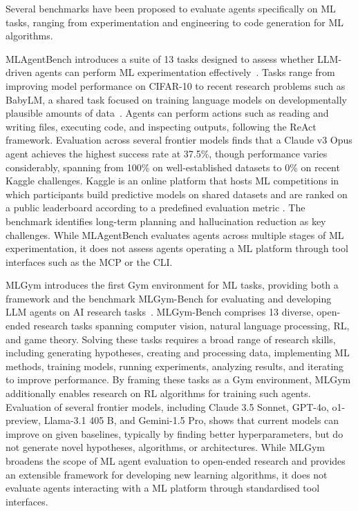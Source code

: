 \documentclass[
english,                 %
bibtex,                  %
includeExtraAbstracts, %
]{kththesis}
\numberwithin{listing}{chapter}
\begin{document}
Several benchmarks have been proposed to evaluate agents specifically on \gls{ML} tasks, ranging from experimentation and engineering to code generation for \gls{ML} algorithms.

\gls{ML}AgentBench introduces a suite of 13 tasks designed to assess whether \gls{LLM}-driven agents can perform \gls{ML} experimentation effectively~\cite{huang_mlagentbench_2024}. Tasks range from improving model performance on \gls{CIFAR}-10 to recent research problems such as \gls{BabyLM}, a shared task focused on training language models on developmentally plausible amounts of data~\cite{edman_mask_2025}. Agents can perform actions such as reading and writing files, executing code, and inspecting outputs, following the ReAct framework. Evaluation across several frontier models finds that a Claude v3 Opus agent achieves the highest success rate at 37.5\%, though performance varies considerably, spanning from 100\% on well-established datasets to 0\% on recent Kaggle challenges. Kaggle is an online platform that hosts \gls{ML} competitions in which participants build predictive models on shared datasets and are ranked on a public leaderboard according to a predefined evaluation metric \cite{kaggle_inc_kaggle_2026}. The benchmark identifies long-term planning and hallucination reduction as key challenges. While \gls{ML}AgentBench evaluates agents across multiple stages of \gls{ML} experimentation, it does not assess agents operating a \gls{ML} platform through tool interfaces such as the \gls{MCP} or the \gls{CLI}.

\gls{ML}Gym introduces the first Gym environment for \gls{ML} tasks, providing both a framework and the benchmark \gls{ML}Gym-Bench for evaluating and developing \gls{LLM} agents on \gls{AI} research tasks~\cite{nathani_mlgym_2025}. \gls{ML}Gym-Bench comprises 13 diverse, open-ended research tasks spanning computer vision, natural language processing, \gls{RL}, and game theory. Solving these tasks requires a broad range of research skills, including generating hypotheses, creating and processing data, implementing \gls{ML} methods, training models, running experiments, analyzing results, and iterating to improve performance. By framing these tasks as a Gym environment, \gls{ML}Gym additionally enables research on \gls{RL} algorithms for training such agents. Evaluation of several frontier models, including Claude 3.5 Sonnet, \gls{GPT}-4o, o1-preview, Llama-3.1 405 \gls{B}, and Gemini-1.5 Pro, shows that current models can improve on given baselines, typically by finding better hyperparameters, but do not generate novel hypotheses, algorithms, or architectures. While \gls{ML}Gym broadens the scope of \gls{ML} agent evaluation to open-ended research and provides an extensible framework for developing new learning algorithms, it does not evaluate agents interacting with a \gls{ML} platform through standardised tool interfaces.
\end{document}
